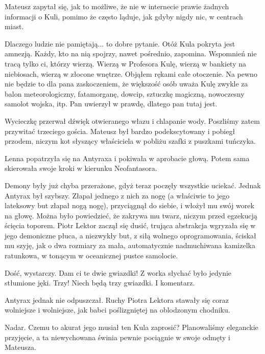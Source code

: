 Mateusz zapytał się, jak to możliwe, że nie w internecie prawie żadnych informacji o Kuli, pomimo że często ląduje, jak gdyby nigdy nic, w centrach miast.
\begin{dialogue}
\ds{} Dlaczego ludzie nie pamiętają... to dobre pytanie.
Otóż Kula pokryta jest amnezją. Każdy, kto na nią spojrzy, nawet pośrednio, zapomina.
Wspomnień nie tracą tylko ci, którzy wierzą. 
Wierzą w Profesora Kulę, wierzą w bankiety na niebiosach, wierzą w złocone wnętrze.
\dm{} Objąłem rękami całe otoczenie. \dm{} 
Na pewno nie będzie to dla pana zaskoczeniem, że większość osób uważa Kulę zwykle za balon meteorologiczny, fatamorganę, dowcip, sztuczkę magiczną, nowoczesny samolot wojska, itp.
Pan uwierzył w prawdę, dlatego pan tutaj jest.
\end{dialogue}

Wycieczkę przerwał dźwięk otwieranego włazu i chlapanie wody.
Poszliśmy zatem przywitać trzeciego gościa. 
Mateusz był bardzo podekscytowany i pobiegł przodem, niczym kot słyszący właściciela w pobliżu szafki z puszkami tuńczyka.

\divider{}

Lenna popatrzyła się na Antyraxa i pokiwała w aprobacie głową.
Potem sama skierowała swoje kroki w kierunku Neofantasora.

Demony były już chyba przerażone, gdyż teraz poczęły wszystkie uciekać.
Jednak Antyrax był szybszy. Złapał jednego z nich za nogę (a właściwie to jego lateksowy but złapał nogą nogę), przyciągnął do siebie, i włożył mu swój worek na głowę.
Można było powiedzieć, że zakrywa mu twarz, niczym przed egzekucją ścięcia toporem.
Piotr Lektor zaczął się dusić, trująca abstrakcja wgryzała się w jego demoniczne płuca, a niezwykły but, z siłą wolnego oprogramowania, ściskał mu szyję,
jak o dwa rozmiary za mała, automatycznie nadmuchiwana kamizelka ratunkowa, w tonącym w oceanicznej pustce samolocie. 

\begin{dialogue}
\ds{} Dość, wystarczy. Dam ci te dwie gwiazdki! \dm{} Z worka słychać było jedynie stłumione jęki. \dm{} Trzy! Niech będą trzy gwiazdki. I komentarz.
\end{dialogue}

Antyrax jednak nie odpuszczał. Ruchy Piotra Lektora stawały się coraz wolniejsze i wolniejsze, jak babci poślizgniętej na oblodzonym chodniku.

\divider{}

Nadar. Czemu to akurat jego musiał ten Kula zaprosić?
Planowaliśmy eleganckie przyjęcie, a ta niewychowana świnia pewnie pociągnie w swoje odmęty i Mateusza.

